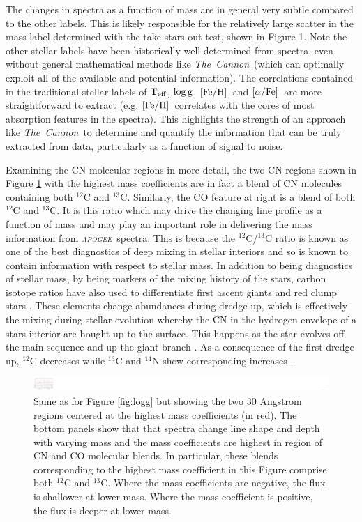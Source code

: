 \documentclass[12pt, preprint]{aastex}
\newcommand{\project}[1]{\textsl{#1}}
\newcommand{\tc}{\project{The~Cannon}}
\newcommand{\apogee}{\project{\textsc{apogee}}}
\newcommand{\teff}{\mbox{$\rm T_{eff}$}}
\newcommand{\feh}{\mbox{$\rm [Fe/H]$}}
\newcommand{\alphafe}{\mbox{$\rm [\alpha/Fe]$}}
\newcommand{\logg}{\mbox{$\rm \log g$}}
\begin{document}
The changes in spectra as a function of mass are in general very subtle compared to the other labels. This is likely responsible for the relatively large scatter in the mass label determined with the take-stars out test, shown in Figure 1. Note the other stellar labels have been historically well determined from spectra, even without general mathematical methods like \tc\ (which can optimally exploit all of the available and potential information). The correlations contained in the traditional stellar labels of \teff, \logg, \feh\ and \alphafe\ are more straightforward to extract (e.g. \feh\ correlates with the cores of most absorption features in the spectra). This highlights the strength of an approach like \tc\ to determine and quantify the information that can be truly extracted from data, particularly as a function of signal to noise. 

Examining the CN molecular regions in more detail, the two CN regions shown in Figure \ref{fig:mass} with the highest mass coefficients are in fact a blend of CN molecules containing both $^{12}$C and $^{13}$C. Similarly, the CO feature at right is a blend of both $^{12}$C and $^{13}$C. It is this ratio which may drive the changing line profile as a function of mass and may play an important role in delivering the mass information from \apogee\ spectra. This is because the $^{12}$C/$^{13}$C ratio is known as one of the best diagnostics of deep mixing in stellar interiors and so is known to contain information with respect to stellar mass.  In addition to being diagnostics of stellar mass, by being markers of the mixing history of the stars, carbon isotope ratios have also used to differentiate first ascent giants and red clump stars \citep[see][and references therein]{Taut2013}. These elements change abundances during dredge-up, which is effectively the mixing during stellar evolution whereby the CN in the hydrogen envelope of a stars interior are bought up to the surface. This happens as the star evolves off the main sequence and up the giant branch \citep{Gilroy1991}. As a consequence of the first dredge up, $^{12}$C decreases while $^{13}$C and $^{14}$N show corresponding increases \citep{Taut2010}. 


\begin{figure}[p]
\centering
    \includegraphics[scale=0.51]{./plots/coeffs_m_3.png}
  \caption{Same as for Figure \ref{fig:logg} but showing the two 30 Angstrom regions centered at the highest mass coefficients (in red). The bottom panels show that that spectra change line shape and depth with varying mass and the mass coefficients are highest in region of CN and CO molecular blends. In particular, these blends corresponding to the highest mass coefficient in this Figure comprise both $^{12}$C and $^{13}$C. Where the mass coefficients are negative, the flux is shallower at lower mass. Where the mass coefficient is positive, the flux is deeper at lower mass.}
\label{fig:mass}
\end{figure}
\end{document}
